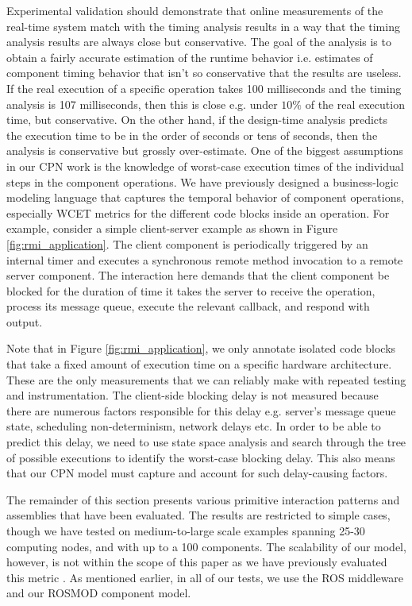 Experimental validation should demonstrate that online measurements of the real-time system match with the timing analysis results in a way that the timing analysis results are always close but conservative. The goal of the analysis is to obtain a fairly accurate estimation of the runtime behavior i.e. estimates of component timing behavior that isn't so conservative that the results are useless. If the real execution of a specific operation takes 100 milliseconds and the timing analysis is 107 milliseconds, then this is close e.g. under $10\%$ of the real execution time, but conservative. On the other hand, if the design-time analysis predicts the execution time to be in the order of seconds or tens of seconds, then the analysis is conservative but grossly over-estimate. One of the biggest assumptions in our CPN work is the knowledge of worst-case execution times of the individual steps in the component operations. We have previously designed \cite{SEUS} a business-logic modeling language that captures the temporal behavior of component operations, especially WCET metrics for the different code blocks inside an operation. For example, consider a simple client-server example as shown in Figure \ref{fig:rmi_application}. The client component is periodically triggered by an internal timer and executes a synchronous remote method invocation to a remote server component. The interaction here demands that the client component be blocked for the duration of time it takes the server to receive the operation, process its message queue, execute the relevant callback, and respond with output. 

Note that in Figure \ref{fig:rmi_application}, we only annotate isolated code blocks that take a fixed amount of execution time on a specific hardware architecture. These are the only measurements that we can reliably make with repeated testing and instrumentation. The client-side blocking delay is not measured because there are numerous factors responsible for this delay e.g. server's message queue state, scheduling non-determinism, network delays etc. In order to be able to predict this delay, we need to use state space analysis and search through the tree of possible executions to identify the worst-case blocking delay. This also means that our CPN model must capture and account for such delay-causing factors. 

The remainder of this section presents various primitive interaction patterns and assemblies that have been evaluated. The results are restricted to simple cases, though we have tested on medium-to-large scale examples spanning 25-30 computing nodes, and with up to a 100 components. The scalability of our model, however, is not within the scope of this paper as we have previously evaluated this metric \cite{SEUS}. As mentioned earlier, in all of our tests, we use the ROS \cite{ROS} middleware and our ROSMOD \cite{kumarROSMOD} component model. 

